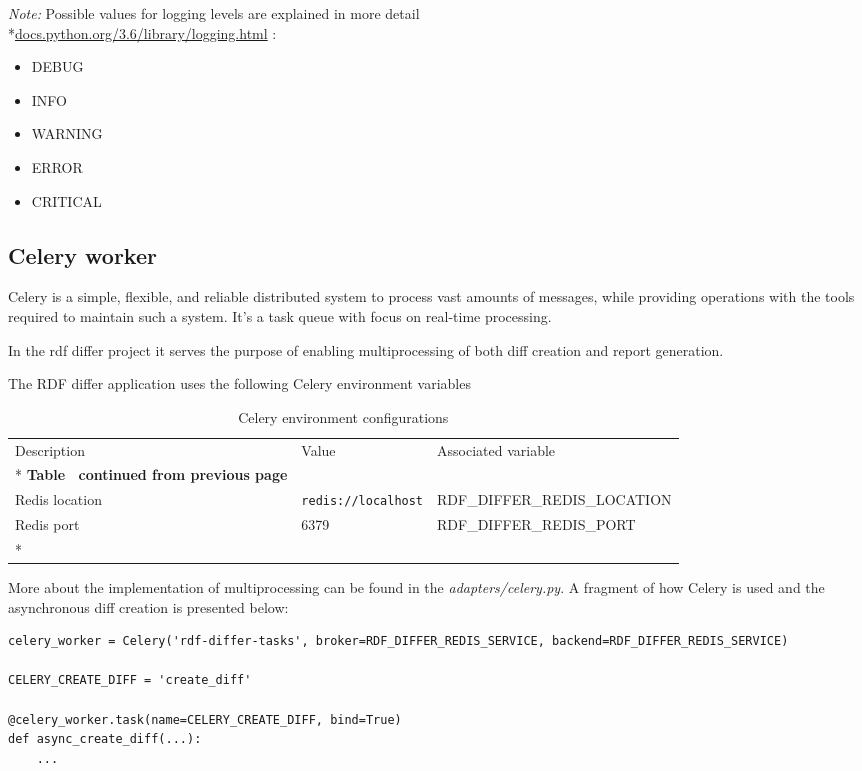 \textit{Note:} Possible values for logging levels are explained in more detail \\*\href{https://docs.python.org/3.6/library/logging.html#logging-levels}{docs.python.org/3.6/library/logging.html} :
\begin{itemize}
	\item DEBUG
	\item INFO
	\item WARNING
	\item ERROR
	\item CRITICAL
\end{itemize}

\subsection{Celery worker}
Celery is a simple, flexible, and reliable distributed system to process vast amounts of messages, while providing operations with the tools required to maintain such a system. It’s a task queue with focus on real-time processing.

In the rdf differ project it serves the purpose of enabling multiprocessing of both diff creation and report generation.

The RDF differ application uses the following Celery environment variables

\begin{longtable}[c]{@{}p{3.5cm}p{3.5cm}l@{}}
	\toprule
	Description    & Value                      & Associated variable          \\* \midrule
	\endfirsthead
	\multicolumn{3}{c}%
	{{\bfseries Table \thetable\ continued from previous page}}                \\
	\endhead
	\bottomrule
	\endfoot
	\endlastfoot
	Redis location & \texttt{redis://localhost} & RDF\_DIFFER\_REDIS\_LOCATION \\
	Redis port     & 6379                       & RDF\_DIFFER\_REDIS\_PORT     \\*\bottomrule
	\caption{Celery environment configurations}
	\label{tab:celery-env}                                                     \\
\end{longtable}

More about the implementation of multiprocessing can be found in the \textit{adapters/celery.py}. A fragment of how Celery is used and the asynchronous diff creation is presented below:

\begin{lstlisting}
celery_worker = Celery('rdf-differ-tasks', broker=RDF_DIFFER_REDIS_SERVICE, backend=RDF_DIFFER_REDIS_SERVICE)

CELERY_CREATE_DIFF = 'create_diff'

@celery_worker.task(name=CELERY_CREATE_DIFF, bind=True)
def async_create_diff(...):
	...
\end{lstlisting}

